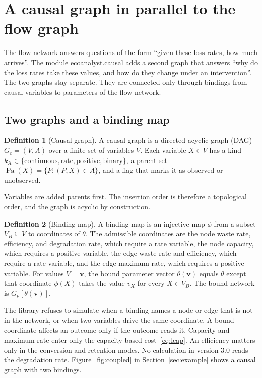 \documentclass[12pt]{article}
\DeclareMathOperator{\Pa}{Pa}
\newcommand{\code}[1]{{\ttfamily\def\_{\textunderscore\allowbreak}#1}}
\theoremstyle{plain}
\theoremstyle{definition}
\newtheorem{definition}{Definition}
\begin{document}
\section{A causal graph in parallel to the flow graph}\label{sec:causal}

The flow network answers questions of the form ``given these loss rates, how much arrives''. The module \code{ecoanalyst.causal} adds a second graph that answers ``why do the loss rates take these values, and how do they change under an intervention''. The two graphs stay separate. They are connected only through bindings from causal variables to parameters of the flow network.

\subsection{Two graphs and a binding map}\label{sec:binding}

\begin{definition}[Causal graph]\label{def:causal}
A causal graph is a directed acyclic graph (DAG) $G_c=(V,A)$ over a finite set of variables $V$. Each variable $X\in V$ has a kind $k_X\in\{\text{continuous},\text{rate},\text{positive},\text{binary}\}$, a parent set $\Pa(X)=\{P:(P,X)\in A\}$, and a flag that marks it as observed or unobserved.
\end{definition}

Variables are added parents first. The insertion order is therefore a topological order, and the graph is acyclic by construction.

\begin{definition}[Binding map]\label{def:bindingmap}
A binding map is an injective map $\phi$ from a subset $V_B\subseteq V$ to coordinates of $\theta$. The admissible coordinates are the node waste rate, efficiency, and degradation rate, which require a rate variable, the node capacity, which requires a positive variable, the edge waste rate and efficiency, which require a rate variable, and the edge maximum rate, which requires a positive variable. For values $V=\mathbf{v}$, the bound parameter vector $\theta(\mathbf{v})$ equals $\theta$ except that coordinate $\phi(X)$ takes the value $v_X$ for every $X\in V_B$. The bound network is $G_p[\theta(\mathbf{v})]$.
\end{definition}

The library refuses to simulate when a binding names a node or edge that is not in the network, or when two variables drive the same coordinate. A bound coordinate affects an outcome only if the outcome reads it. Capacity and maximum rate enter only the capacity-based cost~\eqref{eq:lcap}. An efficiency matters only in the conversion and retention modes. No calculation in version 3.0 reads the degradation rate. Figure~\ref{fig:coupled} in Section~\ref{sec:example} shows a causal graph with two bindings.
\end{document}
